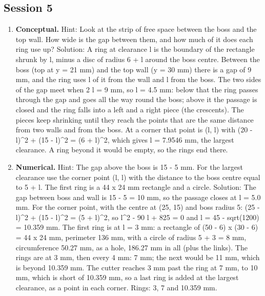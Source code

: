 \documentclass[11pt,a4paper]{article}
\begin{document}
\subsection*{Session 5}
\begin{enumerate}[nosep]
\item \textbf{Conceptual.} Hint: Look at the strip of free space between the boss and the top wall. How wide is the gap between them, and how much of it does each ring use up? Solution: A ring at clearance l is the boundary of the rectangle shrunk by l, minus a disc of radius 6 + l around the boss centre. Between the boss (top at y = 21 mm) and the top wall (y = 30 mm) there is a gap of 9 mm, and the ring uses l of it from the wall and l from the boss. The two sides of the gap meet when 2 l = 9 mm, so l = 4.5 mm: below that the ring passes through the gap and goes all the way round the boss; above it the passage is closed and the ring falls into a left and a right piece (the crescents). The pieces keep shrinking until they reach the points that are the same distance from two walls and from the boss. At a corner that point is (l, l) with (20 - l)\textasciicircum{}2 + (15 - l)\textasciicircum{}2 = (6 + l)\textasciicircum{}2, which gives l = 7.9546 mm, the largest clearance. A ring beyond it would be empty, so the rings end there.
\item \textbf{Numerical.} Hint: The gap above the boss is 15 - 5 mm. For the largest clearance use the corner point (l, l) with the distance to the boss centre equal to 5 + l. The first ring is a 44 x 24 mm rectangle and a circle. Solution: The gap between boss and wall is 15 - 5 = 10 mm, so the passage closes at l = 5.0 mm. For the corner point, with the centre at (25, 15) and boss radius 5: (25 - l)\textasciicircum{}2 + (15 - l)\textasciicircum{}2 = (5 + l)\textasciicircum{}2, so l\textasciicircum{}2 - 90 l + 825 = 0 and l = 45 - sqrt(1200) = 10.359 mm. The first ring is at l = 3 mm: a rectangle of (50 - 6) x (30 - 6) = 44 x 24 mm, perimeter 136 mm, with a circle of radius 5 + 3 = 8 mm, circumference 50.27 mm, as a hole, 186.27 mm in all (plus the links). The rings are at 3 mm, then every 4 mm: 7 mm; the next would be 11 mm, which is beyond 10.359 mm. The cutter reaches 3 mm past the ring at 7 mm, to 10 mm, which is short of 10.359 mm, so a last ring is added at the largest clearance, as a point in each corner. Rings: 3, 7 and 10.359 mm.

\end{enumerate}
\end{document}
